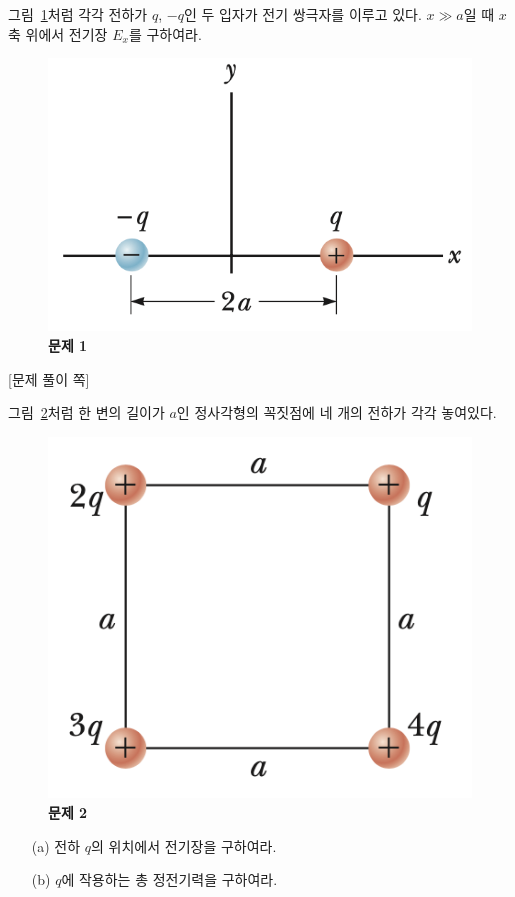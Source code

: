 \documentclass[tightenlines,floatfix,nofootinbib,superscriptaddress,fleqn]{revtex4}
\begin{document}
 그림~\ref{fig:1}처럼 각각 전하가 $q$,
$-q$인 두 입자가 전기 쌍극자를 이루고 있다. $x\gg a$일 때 $x$ 축
위에서 전기장 $E_x$를 구하여라. 
\begin{figure}[htp]
  \centering
  \includegraphics[scale=0.6]{qfig2-1.png}
  \caption{\textbf{문제 1}}
  \label{fig:1}
\end{figure}
\newpage
{\color{gray} [문제 풀이 쪽]}
\newpage

 그림~\ref{fig:2}처럼 한 변의 길이가
$a$인 정사각형의 꼭짓점에 네 개의 전하가 각각 놓여있다.
\begin{figure}[htp]
  \centering
  \includegraphics[scale=0.6]{qfig2-2.png}
  \caption{\textbf{문제 2}}
  \label{fig:2}
\end{figure}
\begin{itemize}
\item[(a)] 전하 $q$의 위치에서 전기장을 구하여라.
\item[(b)] $q$에 작용하는 총 정전기력을 구하여라.
\end{itemize}
\end{document}
